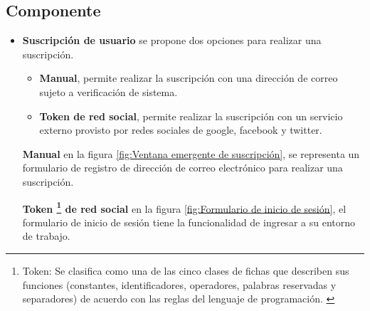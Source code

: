 \subsection{Componente}

\begin{itemize}

\item \textbf{Suscripción de usuario}
se propone dos opciones para realizar una suscripción.

\begin{itemize}

\item \textbf{Manual}, permite realizar la suscripción con una dirección de
correo sujeto a verificación de sistema.

\item \textbf{Token de red social}, permite realizar la suscripción con un
servicio externo provisto por redes sociales de google, facebook y twitter.

\end{itemize}

\textbf{Manual} en la figura \ref{fig:Ventana emergente de suscripción}, se
representa un formulario de registro de dirección de correo electrónico para
realizar una suscripción. 

\begin{minipage}{1.0\textwidth}
	\centering
	\label{fig:Ventana emergente de suscripción}
\end{minipage}

\textbf{Token \footnote{Token: Se clasifica como una de las cinco clases de
fichas que describen sus funciones (constantes, identificadores, operadores,
palabras reservadas y separadores) de acuerdo con las reglas del lenguaje de
programación. \cite{token}} de red social} en la figura \ref{fig:Formulario
de inicio de sesión}, el formulario de inicio de sesión tiene la funcionalidad
de ingresar a su entorno de trabajo.

\begin{minipage}{1.0\textwidth}
	\centering
	\label{fig:Formulario de inicio de sesión}
\end{minipage}

\begin{enumerate}


\end{enumerate}
\end{itemize}
